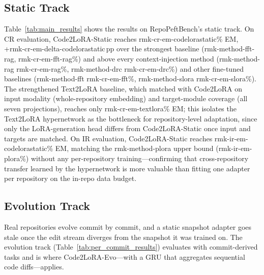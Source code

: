 \documentclass{llmxive}
\providecommand{\UseMacro}[1]{\csname rmk-#1\endcsname}
\providecommand{\codelora}{Code2LoRA\xspace}
\providecommand{\repopeftbench}{RepoPeftBench\xspace}
\providecommand{\codelorastatic}{\codelora-Static\xspace}
\providecommand{\codeloraevo}{\codelora-Evo\xspace}
\providecommand{\textlora}{Text2LoRA\xspace}
\begin{document}
\subsection{Static Track}
\label{sec:results:static}

Table~\ref{tab:main_results} shows the results on \repopeftbench{}'s static track.
On CR evaluation, \codelorastatic{} reaches \UseMacro{cr-em-codelorastatic}\% EM, +\UseMacro{cr-em-delta-codelorastatic}\,pp over the strongest baseline (\UseMacro{method-fft-rag}, \UseMacro{cr-em-fft-rag}\%) and above every context-injection method (\UseMacro{method-rag} \UseMacro{cr-em-rag}\%, \UseMacro{method-drc} \UseMacro{cr-em-drc}\%) and other fine-tuned baselines (\UseMacro{method-fft} \UseMacro{cr-em-fft}\%, \UseMacro{method-slora} \UseMacro{cr-em-slora}\%).
The strengthened \textlora{} baseline, which matched with \codelora{} on input modality (whole-repository embedding) and target-module coverage (all seven projections), reaches only \UseMacro{cr-em-textlora}\% EM;
this isolates the \textlora{} hypernetwork as the bottleneck for repository-level adaptation, since only the LoRA-generation head differs from \codelorastatic{} once input and targets are matched.
On IR evaluation, \codelorastatic{} reaches \UseMacro{ir-em-codelorastatic}\% EM, matching the \UseMacro{method-plora} upper bound (\UseMacro{ir-em-plora}\%) without any per-repository training---confirming that cross-repository transfer learned by the hypernetwork is more valuable than fitting one adapter per repository on the in-repo data budget.

\subsection{Evolution Track}
\label{sec:results:evolution}

Real repositories evolve commit by commit, and a static snapshot adapter goes stale once the edit stream diverges from the snapshot it was trained on.
The evolution track (Table~\ref{tab:per_commit_results}) evaluates with commit-derived tasks and is where \codeloraevo{}---with a GRU that aggregates sequential code diffs---applies.
\end{document}
